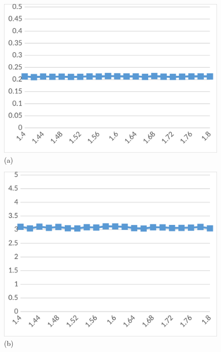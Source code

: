 \begin{figure}
  \begin{minipage}{0.32\textwidth}
    \centering
    \includegraphics[width=\textwidth]{figs/inv_ql_fifo.png}
    (a)
  \end{minipage}\hspace{0.01\textwidth}
  \begin{minipage}{0.32\textwidth}
    \centering
    \includegraphics[width=\textwidth]{figs/inv_ql_normal.png}
    (b)
  \end{minipage}\hspace{0.01\textwidth}
  \begin{minipage}{0.32\textwidth}
    \centering

\end{minipage}
\end{figure}
